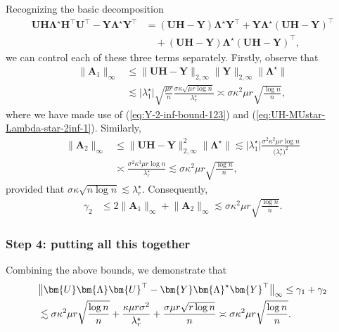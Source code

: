 Recognizing the basic decomposition
%
\begin{align*}
\bm{U}\bm{H}\bm{\Lambda}^{\star}\bm{H}^{\top}\bm{U}^{\top}-\bm{Y}\bm{\Lambda}^{\star}\bm{Y}^{\top} & =(\bm{U}\bm{H}-\bm{Y})\bm{\Lambda}^{\star}\bm{Y}^{\top}+\bm{Y}\bm{\Lambda}^{\star}(\bm{U}\bm{H}-\bm{Y})^{\top}\\
 & \quad+(\bm{U}\bm{H}-\bm{Y})\bm{\Lambda}^{\star}(\bm{U}\bm{H}-\bm{Y})^{\top},
\end{align*}
%
we can control each of these three terms separately.  
Firstly, observe that
\begin{align*}
\big\|\bm{A}_{1}\big\|_{\infty} & \leq\|\bm{U}\bm{H}-\bm{Y}\|_{2,\infty}\big\|\bm{Y}\big\|_{2,\infty}\big\|\bm{\Lambda}^{\star}\big\|\\
 & \lesssim\big|\lambda_{1}^{\star}\big|\sqrt{\frac{\mu r}{n}}\frac{\sigma\kappa\sqrt{\mu r\log n}}{\lambda_{r}^{\star}}\asymp\sigma\kappa^{2}\mu r\sqrt{\frac{\log n}{n}},
\end{align*}
where we have made use of (\ref{eq:Y-2-inf-bound-123}) and (\ref{eq:UH-MUstar-Lambda-star-2inf-1}).
Similarly,
\begin{align*}
\big\|\bm{A}_{2}\big\|_{\infty} & \leq\|\bm{U}\bm{H}-\bm{Y}\|_{2,\infty}^{2}\big\|\bm{\Lambda}^{\star}\big\|\lesssim\big|\lambda_{1}^{\star}\big|\frac{\sigma^{2}\kappa^{2}\mu r\log n}{\big(\lambda_{r}^{\star}\big)^{2}}\\
 & \asymp\frac{\sigma^{2}\kappa^{3}\mu r\log n}{\lambda_{r}^{\star}}\lesssim\sigma\kappa^{2}\mu r\sqrt{\frac{\log n}{n}},
\end{align*}
provided that $\sigma\kappa\sqrt{n\log n}\lesssim\lambda_{r}^{\star}$.
Consequently,
%
\begin{align*}
\gamma_2 & \leq2\big\|\bm{A}_{1}\big\|_{\infty}+\big\|\bm{A}_{2}\big\|_{\infty}\lesssim\sigma\kappa^{2}\mu r\sqrt{\frac{\log n}{n}}.
\end{align*}



\subsubsection{Step 4: putting all this together}

Combining the above bounds, we demonstrate that
%
\begin{align}
	& \big\|\bm{U}\bm{\Lambda}\bm{U}^{\top}-\bm{Y}\bm{\Lambda}^{\star}\bm{Y}^{\top}\big\|_{\infty} 
	\leq\gamma_{1}+\gamma_{2} \notag\\
& \lesssim\sigma\kappa^{2}\mu r\sqrt{\frac{\log n}{n}}+\frac{\kappa\mu r\sigma^{2}}{\lambda_{r}^{\star}}+\frac{\sigma\mu r\sqrt{r\log n}}{n} 
  \asymp\sigma\kappa^{2}\mu r\sqrt{\frac{\log n}{n}}.
\end{align}
%




